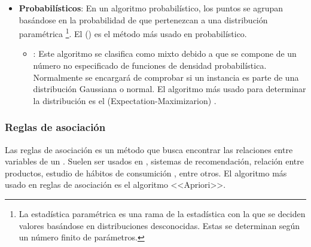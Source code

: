 \begin{itemize}
        Por otro lado, el acercamiento divisivo, o  funciona dividiendo un único  basándose en las diferencias entre instancias (puntos del ). Visualmente se parece a un dendrograma\footnote{Representación gráfica de datos en forma de árbol para organizar datos en categorías y subcategorías hasta alcanzar el nivel de detalle deseado}.

  \item \textbf{Probabilísticos}: En un algoritmo probabilístico, los puntos se agrupan basándose en la probabilidad de que pertenezcan a una distribución paramétrica \footnote{La estadística paramétrica es una rama de la estadística con la que se deciden valores basándose en distribuciones desconocidas. Estas se determinan según un número finito de parámetros.}. El  () es el método más usado en  probabilístico.
        \begin{itemize}
          \item {}: Este algoritmo se clasifica como mixto debido a que se compone de un número no especificado de funciones de densidad probabilística. Normalmente se encargará de comprobar si un instancia es parte de una distribución Gaussiana o normal. El algoritmo más usado para determinar la distribución es el  (Expectation-Maximizarion) .
        \end{itemize}
\end{itemize}

\subsubsection{Reglas de asociación}

Las reglas de asociación es un método que busca encontrar las relaciones entre variables de un . Suelen ser usados en , sistemas de recomendación, relación entre productos, estudio de hábitos de consumición , entre otros. El algoritmo más usado en reglas de asociación es el algoritmo <<Apriori>>.


